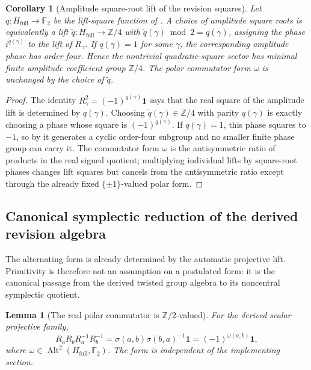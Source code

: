 \documentclass[11pt]{article}
\newtheorem{lemma}[theorem]{Lemma}
\newtheorem{corollary}[theorem]{Corollary}
\theoremstyle{definition}
\theoremstyle{remark}
\newcommand{\F}{\mathbb{F}}
\newcommand{\Ztwo}{\mathbb{Z}/2}
\newcommand{\Zfour}{\mathbb{Z}/4}
\newcommand{\Hf}{H_{\mathrm{full}}}
\newcommand{\one}{\mathbf{1}}
\newcommand{\Alt}{\operatorname{Alt}}
\begin{document}
\begin{corollary}[Amplitude square-root lift of the revision squares]
\label{cor:revision-z4-square-root}
Let \(q:\Hf\to\F_2\) be the lift-square function of
.  A choice of amplitude square
roots is equivalently a lift \(\widetilde q:\Hf\to\Zfour\) with
\(\widetilde q(\gamma)\bmod2=q(\gamma)\), assigning the phase
\(i^{\widetilde q(\gamma)}\) to the lift of \(R_\gamma\).  If
\(q(\gamma)=1\) for some \(\gamma\), the corresponding amplitude phase has order
four.  Hence the nontrivial quadratic-square sector has minimal finite amplitude
coefficient group \(\Zfour\).  The polar commutator form \(\omega\) is unchanged
by the choice of \(\widetilde q\).
\end{corollary}

\begin{proof}
The identity \(R_\gamma^2=(-1)^{q(\gamma)}\one\) says that the real square of the
amplitude lift is determined by \(q(\gamma)\).  Choosing
\(\widetilde q(\gamma)\in\Zfour\) with parity \(q(\gamma)\) is exactly choosing a
phase whose square is \((-1)^{q(\gamma)}\).  If \(q(\gamma)=1\), this phase
squares to \(-1\), so by  it generates a
cyclic order-four subgroup and no smaller finite phase group can carry it.  The
commutator form \(\omega\) is the antisymmetric ratio of products in the real
signed quotient; multiplying individual lifts by square-root phases changes lift
squares but cancels from the antisymmetric ratio except through the already fixed
\(\{\pm1\}\)-valued polar form.
\end{proof}



\subsection{Canonical symplectic reduction of the derived revision algebra}
\label{sec:cx}

The alternating form is already determined by the automatic projective lift.
Primitivity is therefore not an assumption on a postulated form: it is the
canonical passage from the derived twisted group algebra to its noncentral
symplectic quotient.

\begin{lemma}[The real polar commutator is \(\Ztwo\)-valued]
\label{lem:commutator-pm1}
For the derived scalar projective family,
\[
  R_aR_bR_a^{-1}R_b^{-1}
  =\sigma(a,b)\sigma(b,a)^{-1}\one
  =(-1)^{\omega(a,b)}\one,
\]
where \(\omega\in\Alt^2(\Hf,\F_2)\).  The form is independent of the
implementing section.
\end{lemma}
\end{document}
